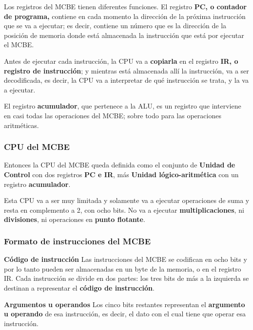 \documentclass[spanish,a4paper,]{article}
\begin{document}
Los registros del MCBE tienen diferentes funciones. El registro
\textbf{PC, o contador de programa,} contiene en cada momento la
dirección de la próxima instrucción que se va a ejecutar; es decir,
contiene un número que es la dirección de la posición de memoria donde
está almacenada la instrucción que está por ejecutar el MCBE.

Antes de ejecutar cada instrucción, la CPU va a \textbf{copiarla} en el
registro \textbf{IR, o registro de instrucción}; y mientras está
almacenada allí la instrucción, va a ser decodificada, es decir, la CPU
va a interpretar de qué instrucción se trata, y la va a ejecutar.

El registro \textbf{acumulador}, que pertenece a la ALU, es un registro
que interviene en casi todas las operaciones del MCBE; sobre todo para
las operaciones aritméticas.

\hypertarget{cpu-del-mcbe}{%
\subsubsection{CPU del MCBE}\label{cpu-del-mcbe}}

Entonces la CPU del MCBE queda definida como el conjunto de
\textbf{Unidad de Control} con dos registros \textbf{PC e IR}, más
\textbf{Unidad lógico-aritmética} con un registro \textbf{acumulador}.

Esta CPU va a ser muy limitada y solamente va a ejecutar operaciones de
suma y resta en complemento a 2, con ocho bits. No va a ejecutar
\textbf{multiplicaciones}, ni \textbf{divisiones}, ni operaciones en
\textbf{punto flotante}.

\hypertarget{formato-de-instrucciones-del-mcbe}{%
\subsubsection{Formato de instrucciones del
MCBE}\label{formato-de-instrucciones-del-mcbe}}

\textbf{Código de instrucción} Las instrucciones del MCBE se codifican
en ocho bits y por lo tanto pueden ser almacenadas en un byte de la
memoria, o en el registro IR. Cada instrucción se divide en dos partes:
los tres bits de más a la izquierda se destinan a representar el
\textbf{código de instrucción}.

\textbf{Argumentos u operandos} Los cinco bits restantes representan el
\textbf{argumento u operando} de esa instrucción, es decir, el dato con
el cual tiene que operar esa instrucción.
\end{document}
